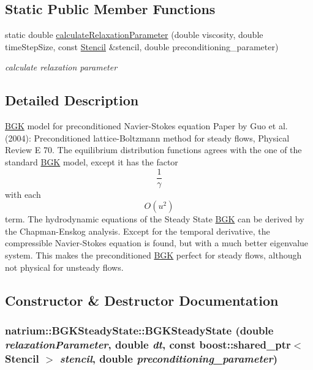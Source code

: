 \subsection*{Static Public Member Functions}
\begin{DoxyCompactItemize}
\item 
static double \hyperlink{classnatrium_1_1BGKSteadyState_a2cd6628c71475663e204656147de99b8}{calculateRelaxationParameter} (double viscosity, double timeStepSize, const \hyperlink{classnatrium_1_1Stencil}{Stencil} \&stencil, double preconditioning\_\-parameter)
\begin{DoxyCompactList}\small\item\em calculate relaxation parameter \item\end{DoxyCompactList}\end{DoxyCompactItemize}


\subsection{Detailed Description}
\hyperlink{classnatrium_1_1BGK}{BGK} model for preconditioned Navier-\/Stokes equation Paper by Guo et al. (2004): Preconditioned lattice-\/Boltzmann method for steady flows, Physical Review E 70. The equilibrium distribution functions agrees with the one of the standard \hyperlink{classnatrium_1_1BGK}{BGK} model, except it has the factor \[\frac{1}{\gamma}\] with each \[ O(u^2) \] term. The hydrodynamic equations of the Steady State \hyperlink{classnatrium_1_1BGK}{BGK} can be derived by the Chapman-\/Enskog analysis. Except for the temporal derivative, the compressible Navier-\/Stokes equation is found, but with a much better eigenvalue system. This makes the preconditioned \hyperlink{classnatrium_1_1BGK}{BGK} perfect for steady flows, although not physical for unsteady flows. 

\subsection{Constructor \& Destructor Documentation}
\hypertarget{classnatrium_1_1BGKSteadyState_a36e281915902e8ac1e347a22e382ac3f}{
\subsubsection[{BGKSteadyState}]{\setlength{\rightskip}{0pt plus 5cm}natrium::BGKSteadyState::BGKSteadyState (double {\em relaxationParameter}, \/  double {\em dt}, \/  const boost::shared\_\-ptr$<$ {\bf Stencil} $>$ {\em stencil}, \/  double {\em preconditioning\_\-parameter})}}
\label{classnatrium_1_1BGKSteadyState_a36e281915902e8ac1e347a22e382ac3f}


